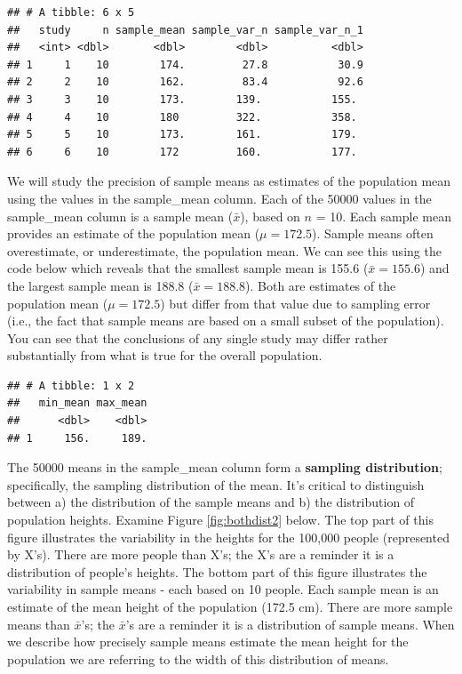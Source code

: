 \documentclass[
]{krantz}
\makeatletter
\newenvironment{Shaded}{\begin{snugshade}}{\end{snugshade}}
\newcommand{\DataTypeTok}[1]{\textcolor[rgb]{0.27,0.27,0.27}{#1}}
\newcommand{\KeywordTok}[1]{\textcolor[rgb]{0.27,0.27,0.27}{\textbf{#1}}}
\newcommand{\NormalTok}[1]{#1}
\newcommand{\OperatorTok}[1]{\textcolor[rgb]{0.43,0.43,0.43}{\textbf{#1}}}
\newcommand{\StringTok}[1]{\textcolor[rgb]{0.5,0.5,0.5}{#1}}
\newenvironment{kframe}{%
\medskip{}
\setlength{\fboxsep}{.8em}
 \def\at@end@of@kframe{}%
 \ifinner\ifhmode%
  \def\at@end@of@kframe{\end{minipage}}%
  \begin{minipage}{\columnwidth}%
 \fi\fi%
 \def\FrameCommand##1{\hskip\@totalleftmargin \hskip-\fboxsep
 \colorbox{shadecolor}{##1}\hskip-\fboxsep
     \hskip-\linewidth \hskip-\@totalleftmargin \hskip\columnwidth}%
 \MakeFramed {\advance\hsize-\width
   \@totalleftmargin\z@ \linewidth\hsize
   \@setminipage}}%
 {\par\unskip\endMakeFramed%
 \at@end@of@kframe}
\renewenvironment{Shaded}{\begin{kframe}}{\end{kframe}}
\makeatother
\begin{document}
\begin{verbatim}
## # A tibble: 6 x 5
##   study     n sample_mean sample_var_n sample_var_n_1
##   <int> <dbl>       <dbl>        <dbl>          <dbl>
## 1     1    10        174.         27.8           30.9
## 2     2    10        162.         83.4           92.6
## 3     3    10        173.        139.           155. 
## 4     4    10        180         322.           358. 
## 5     5    10        173.        161.           179. 
## 6     6    10        172         160.           177.
\end{verbatim}

We will study the precision of sample means as estimates of the population mean using the values in the sample\_mean column. Each of the 50000 values in the sample\_mean column is a sample mean (\(\bar{x}\)), based on \(n\) = 10. Each sample mean provides an estimate of the population mean (\(\mu = 172.5\)). Sample means often overestimate, or underestimate, the population mean. We can see this using the code below which reveals that the smallest sample mean is 155.6 (\(\bar{x} = 155.6\)) and the largest sample mean is 188.8 (\(\bar{x} = 188.8\)). Both are estimates of the population mean (\(\mu = 172.5\)) but differ from that value due to sampling error (i.e., the fact that sample means are based on a small subset of the population). You can see that the conclusions of any single study may differ rather substantially from what is true for the overall population.

\begin{Shaded}
\end{Shaded}

\begin{verbatim}
## # A tibble: 1 x 2
##   min_mean max_mean
##      <dbl>    <dbl>
## 1     156.     189.
\end{verbatim}

The 50000 means in the sample\_mean column form a \textbf{sampling distribution}; specifically, the sampling distribution of the mean. It's critical to distinguish between a) the distribution of the sample means and b) the distribution of population heights. Examine Figure \ref{fig:bothdist2} below. The top part of this figure illustrates the variability in the heights for the 100,000 people (represented by X's). There are more people than X's; the X's are a reminder it is a distribution of people's heights. The bottom part of this figure illustrates the variability in sample means - each based on 10 people. Each sample mean is an estimate of the mean height of the population (172.5 cm). There are more sample means than \(\bar{x}\)'s; the \(\bar{x}\)'s are a reminder it is a distribution of sample means. When we describe how precisely sample means estimate the mean height for the population we are referring to the width of this distribution of means.
\end{document}
